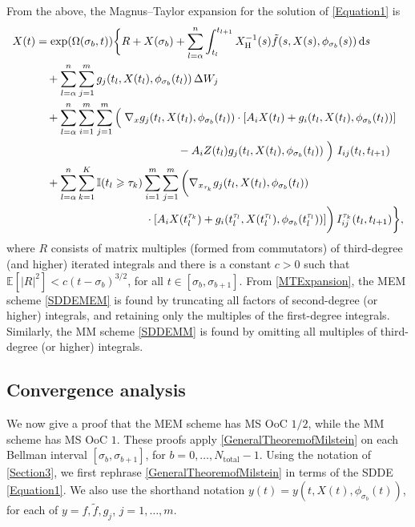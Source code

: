 \documentclass[onefignum]{siamart250211}
\providecommand{\abs}[1]{\left|#1\right|}
\begin{document}
From the above, the Magnus--Taylor expansion for the solution of \cref{Equation1} is
\begin{align}
X(t)&=\exp(\Omega(\sigma_b,t))\bigg\{R+X(\sigma_b)+\sum_{l=\alpha}^n\int_{t_l}^{t_{l+1}}X_\mathrm{H}^{-1}(s)\tilde{f}(s,X(s),\phi_{\sigma_b}(s))\,\mathrm{d}s\nonumber\\
&\quad+\sum_{l=\alpha}^n\sum_{j=1}^mg_j(t_l,X(t_l),\phi_{\sigma_b}(t_l))\,\Delta W_j\label{MTExpansion}\\
&\quad+\sum_{l=\alpha}^n\sum_{i=1}^m\sum_{j=1}^m\left(\vphantom{\sum}\right.\nabla_xg_j(t_l,X(t_l),\phi_{\sigma_b}(t_l))\cdot[A_iX(t_l)+g_i(t_l,X(t_l),\phi_{\sigma_b}(t_l))]\nonumber\\
&\quad\quad\hspace{3.75cm}-A_iZ(t_l)g_j(t_l,X(t_l),\phi_{\sigma_b}(t_l))\left.\vphantom{\sum}\right)\,I_{ij}(t_l,t_{l+1})\nonumber\\
&\quad+\sum_{l=\alpha}^n\sum_{k=1}^K\mathbb{I}(t_l\geqslant\tau_k)\sum_{i=1}^m\sum_{j=1}^m\bigg(\nabla_{x_{\tau_k}}g_j(t_l,X(t_l),\phi_{\sigma_b}(t_l))\nonumber\\
&\quad\quad\hspace{2.75cm}\cdot[A_iX(t_l^{\tau_k})+g_i(t_l^{\tau_l},X(t_l^{\tau_l}),\phi_{\sigma_b}(t_l^{\tau_l}))]\bigg)\,I_{ij}^{\tau_k}(t_l,t_{l+1})\bigg\},\nonumber
\end{align}
where $R$ consists of matrix multiples (formed from commutators) of third-degree (and higher) iterated integrals and there is a constant $c>0$ such that $\mathbb{E}[\abs{R}^2]<c(t-\sigma_b)^{3/2}$, for all $t\in[\sigma_b,\sigma_{b+1}]$. From \cref{MTExpansion}, the MEM scheme \cref{SDDEMEM} is found by truncating all factors of second-degree (or higher) integrals, and retaining only the multiples of the first-degree integrals. Similarly, the MM scheme \cref{SDDEMM} is found by omitting all multiples of third-degree (or higher) integrals.




\subsection{Convergence analysis}

We now give a proof that the MEM scheme has MS OoC $1/2$, while the MM scheme has MS OoC $1$. These proofs apply \cref{GeneralTheoremofMilstein} on each Bellman interval $[\sigma_b,\sigma_{b+1}]$, for $b=0,\ldots,{N_{\mathrm{total}}}-1$. Using the notation of \cref{Section3}, we first rephrase \cref{GeneralTheoremofMilstein} in terms of the SDDE \cref{Equation1}. We also use the shorthand notation $y(t)=y(t,X(t),\phi_{\sigma_b}(t))$, for each of $y=f,\tilde{f},g_j$, $j=1,\ldots,m$.
\end{document}
